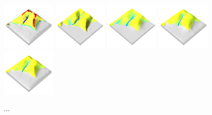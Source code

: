 \documentclass[prodmode,acmtochi]{acmsmall} %
\begin{document}
\begin{figure}[h!]
\begin{center}
		\includegraphics[width=0.24\textwidth]{images/render_3d/mean_forms_3.png}
		\includegraphics[width=0.24\textwidth]{images/render_3d/depth_1.png}
		\includegraphics[width=0.24\textwidth]{images/render_3d/mean_depth_1.png}
		\includegraphics[width=0.24\textwidth]{images/render_3d/mean_depth_2.png}
		\includegraphics[width=0.24\textwidth]{images/render_3d/mean_depth_3.png}
	\caption{...}
	\label{fig:}
\end{center}
\end{figure}


\end{document}
